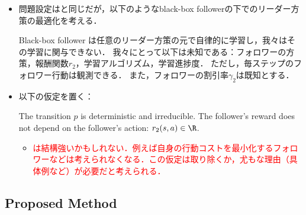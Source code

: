\documentclass[a4paper,10pt,dvipdfmx]{jsarticle}
\begin{document}
\begin{itemize}
    \item 問題設定はと同じだが，以下のようなblack-box followerの下でのリーダー方策の最適化を考える．
    \begin{definition}\label{thrm:bb_follower_definition}
        Black-box follower は任意のリーダー方策の元で自律的に学習し，我々はその学習に関与できない．
        我々にとって以下は未知である：フォロワーの方策，報酬関数$r_2$，学習アルゴリズム，学習進捗度．
        ただし，毎ステップのフォロワー行動は観測できる．
        また，フォロワーの割引率$\gamma_2$は既知とする．
    \end{definition}
    \item 以下の仮定を置く：
    \begin{assumption}\label{thrm:assumption_AIRL}
        The transition $p$ is deterministic and irreducible.
        The follower's reward does not depend on the follower's action: $r_2(s,a)\in\R$.
    \end{assumption}
    \begin{itemize}
        \item \textcolor{red}{は結構強いかもしれない．例えば自身の行動コストを最小化するフォロワーなどは考えられなくなる．この仮定は取り除くか，尤もな理由（具体例など）が必要だと考えられる．}
    \end{itemize}
\end{itemize}

\subsection{Proposed Method}
\end{document}
